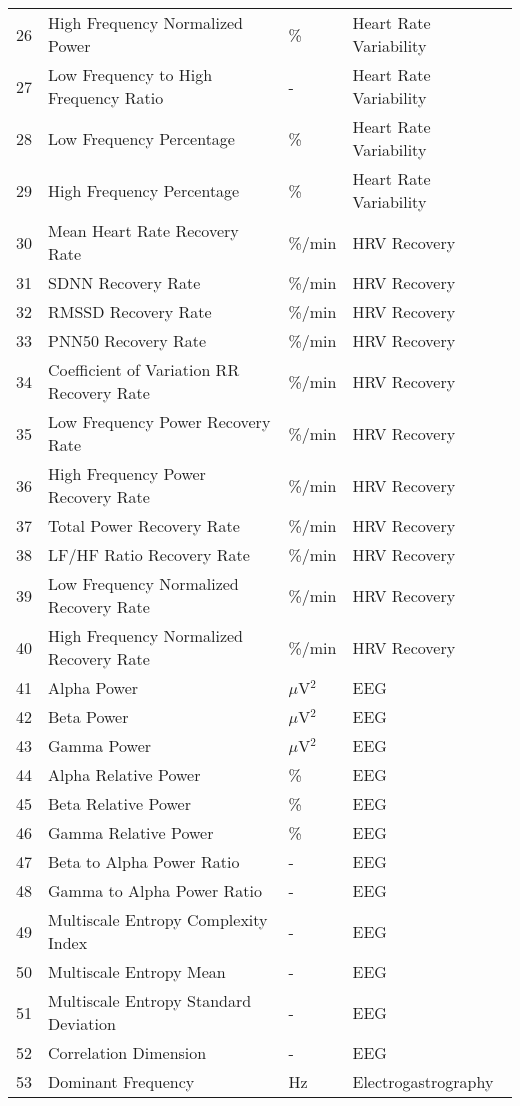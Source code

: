 \documentclass[11pt]{article}
\begin{document}
\begin{longtable}{p{1cm}p{7cm}p{3cm}p{4cm}}
26 & High Frequency Normalized Power & \% & Heart Rate Variability \\
27 & Low Frequency to High Frequency Ratio & - & Heart Rate Variability \\
28 & Low Frequency Percentage & \% & Heart Rate Variability \\
29 & High Frequency Percentage & \% & Heart Rate Variability \\
30 & Mean Heart Rate Recovery Rate & \%/min & HRV Recovery \\
31 & SDNN Recovery Rate & \%/min & HRV Recovery \\
32 & RMSSD Recovery Rate & \%/min & HRV Recovery \\
33 & PNN50 Recovery Rate & \%/min & HRV Recovery \\
34 & Coefficient of Variation RR Recovery Rate & \%/min & HRV Recovery \\
35 & Low Frequency Power Recovery Rate & \%/min & HRV Recovery \\
36 & High Frequency Power Recovery Rate & \%/min & HRV Recovery \\
37 & Total Power Recovery Rate & \%/min & HRV Recovery \\
38 & LF/HF Ratio Recovery Rate & \%/min & HRV Recovery \\
39 & Low Frequency Normalized Recovery Rate & \%/min & HRV Recovery \\
40 & High Frequency Normalized Recovery Rate & \%/min & HRV Recovery \\
41 & Alpha Power & $\mu$V$^2$ & EEG \\
42 & Beta Power & $\mu$V$^2$ & EEG \\
43 & Gamma Power & $\mu$V$^2$ & EEG \\
44 & Alpha Relative Power & \% & EEG \\
45 & Beta Relative Power & \% & EEG \\
46 & Gamma Relative Power & \% & EEG \\
47 & Beta to Alpha Power Ratio & - & EEG \\
48 & Gamma to Alpha Power Ratio & - & EEG \\
49 & Multiscale Entropy Complexity Index & - & EEG \\
50 & Multiscale Entropy Mean & - & EEG \\
51 & Multiscale Entropy Standard Deviation & - & EEG \\
52 & Correlation Dimension & - & EEG \\
53 & Dominant Frequency & Hz & Electrogastrography \\

\end{longtable}
\end{document}
